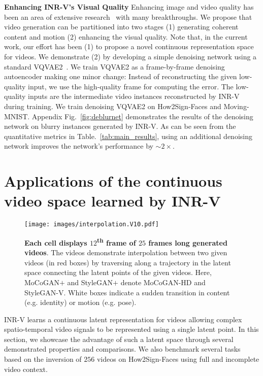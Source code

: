 \documentclass[10pt]{article} \usepackage[accepted]{tmlr}
\begin{document}
\textbf{Enhancing INR-V's Visual Quality} 
Enhancing image and video quality has been an area of extensive research~\cite{gpen, tecogan, vrt, iseebetter} with many breakthroughs.
We propose that video generation can be partitioned into two stages (1) generating coherent content and motion (2) enhancing the visual quality. Note that, in the current work, our effort has been (1) to propose a novel continuous representation space for videos. 
We demonstrate (2) by developing a simple denoising network using a standard VQVAE2~\cite{vqvae2}. We train VQVAE2 as a frame-by-frame denoising autoencoder making one minor change: Instead of reconstructing the given low-quality input, we use the high-quality frame for computing the error. The low-quality inputs are the intermediate video instances reconstructed by INR-V during training. We train denoising VQVAE2 on How2Sign-Faces and Moving-MNIST. Appendix Fig.~\ref{fig:deblurnet} demonstrates the results of the denoising network on blurry instances generated by INR-V. 
As can be seen from the quantitative metrics in Table.~\ref{tab:main_results}, using an additional denoising network improves the network's performance by $\sim 2 \times$. 

\section{Applications of the continuous video space learned by INR-V }

\begin{figure}
  \centering
  \texttt{[image: images/interpolation.V10.pdf]}
    \caption{\textbf{Each cell displays $12$\textsuperscript{th} frame of $25$ frames long generated videos}. The videos demonstrate interpolation between two given videos (in red boxes) by traversing along a trajectory in the latent space connecting the latent points of the given videos. Here, MoCoGAN$+$ and StyleGAN$+$ denote MoCoGAN-HD and StyleGAN-V. White boxes indicate a sudden transition in content (e.g. identity) or motion (e.g. pose).
    }
  \label{fig:interpolation}
\end{figure}

INR-V learns a continuous latent representation for videos allowing complex spatio-temporal video signals to be represented using a single latent point. In this section, we showcase the advantage of such a latent space through several demonstrated properties and comparisons. We also benchmark several tasks based on the inversion of $256$ videos on How2Sign-Faces using full and incomplete video context. 
\end{document}
